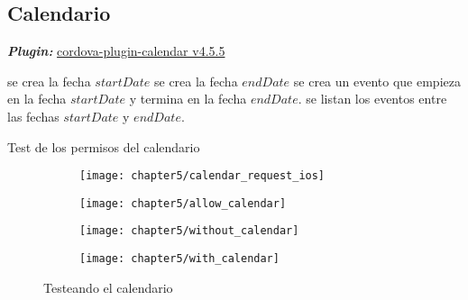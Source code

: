 \subsection{Calendario}
\textbf{\emph{Plugin:}} \href{https://www.npmjs.com/package/cordova-plugin-calendar}{cordova-plugin-calendar v4.5.5}
\begin{algorithm}
	\begin{algorithmic}[1]
		\STATE se crea la fecha $startDate$
		\STATE se crea la fecha $endDate$
		\STATE se crea un evento que empieza en la fecha $startDate$ y termina en la fecha $endDate$.
		\STATE se listan los eventos entre las fechas $startDate$ y $endDate$.
	\end{algorithmic}
	\caption{Test de los permisos del calendario}\label{alg:chap5:test_calendario}
\end{algorithm}
\begin{figure}[!ht]
	\begin{subfigure}{.24\textwidth}
	    \centering
		\texttt{[image: chapter5/calendar\_request\_ios]}
		\label{fig:chapter05:allow_calendar_ios}
	\end{subfigure}
	\begin{subfigure}{.24\textwidth}
	    \centering
		\texttt{[image: chapter5/allow\_calendar]}
		\label{fig:chapter05:allow_calendar_android}
	\end{subfigure}	
	\begin{subfigure}{.25\textwidth}
	    \centering
		\texttt{[image: chapter5/without\_calendar]}
		\label{fig:chapter05:without_calendar}
	\end{subfigure}
	\begin{subfigure}{.25\textwidth}
	    \centering
		\texttt{[image: chapter5/with\_calendar]}
		\label{fig:chapter05:with_calendar}
	\end{subfigure}
	\caption{Testeando el calendario}
	\label{fig:chapter05:calendar_test}
\end{figure}
\newpage
